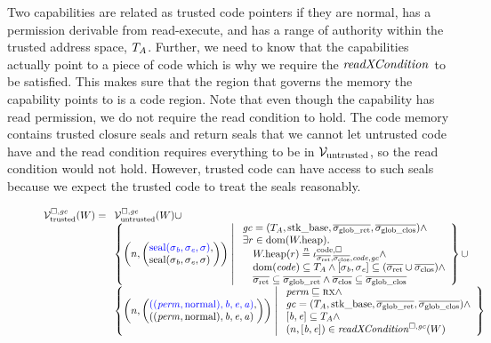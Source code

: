 \begin{jversion}
Two capabilities are related as trusted code pointers if they are normal, has a permission derivable from read-execute, and has a range of authority within the trusted address space, $T_{A}$.
Further, we need to know that the capabilities actually point to a piece of code which is why we require the $\xReadCond[]{}$ to be satisfied.
This makes sure that the region that governs the memory the capability points to is a code region.
Note that even though the capability has read permission, we do not require the read condition to hold.
The code memory contains trusted closure seals and return seals that we cannot let untrusted code have and the read condition requires everything to be in $\mathcal{V}_{\mathrm{untrusted}}$, so the read condition would not hold.
However, trusted code can have access to such seals because we expect the trusted code to treat the seals reasonably.
\begin{figure}
  \centering
  \[
  \lrvtrusted[\square,\gc](W) =
  \begin{array}[t]{l}
    \lrv(W)\cup \\
%
    \left\{ \npair{\left(\arraycolsep=0pt\array{l} \src{\seal{\sigma_\baddr,\sigma_\eaddr,\sigma}},\\ \seal{\sigma_\baddr,\sigma_\eaddr,\sigma} \endarray \right)} 
    \; \middle| \;
    \begin{array}{l}
      \gc = (\ta,\stkb,\gsigrets,\gsigcloss)  \wedge \\
      \exists r \in \dom(\pwheap) \ldotp \\
      \quad \pwheap(r) \nequal \codereg{\sigrets,\sigcloss,\code,\gc} \wedge\\
      \quad \dom(\code) \subseteq \ta \wedge [\sigma_\baddr,\sigma_\eaddr] \subseteq (\sigrets\cup\sigcloss) \wedge\\
      \quad \sigrets \subseteq \gsigrets \wedge \sigcloss \subseteq \gsigcloss
    \end{array}
    \right\} \cup \\
    \left\{ \npair{\left(\arraycolsep=0pt\array{l} \src{((\perm,\normal),\baddr,\eaddr,\aaddr)},\\ ((\perm,\normal),\baddr,\eaddr,\aaddr) \endarray \right)} \;\middle|\; 
    \begin{array}{l}
      \perm \sqsubseteq \rx \wedge \\
      \gc = (\ta,\stkb,\gsigrets,\gsigcloss)  \wedge \\
      {} [\baddr,\eaddr] \subseteq \ta \wedge\\
      \npair{[\baddr,\eaddr]} \in \xReadCond[\square,\gc]{W} 
    \end{array}
    \right\}
  \end{array}
\]


\end{figure}
\end{jversion}
